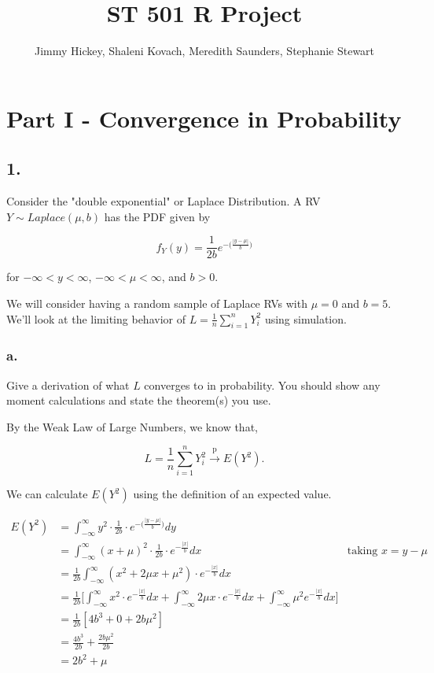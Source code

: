 \documentclass[12pt]{article}
\title{ST 501 R Project}
\author{Jimmy Hickey, Shaleni Kovach, Meredith Saunders, Stephanie Stewart}
\begin{document}
\maketitle
\tableofcontents
\clearpage

\doublespacing

\section{Part I - Convergence in Probability}

\subsection{1.}
Consider the "double exponential" or Laplace Distribution. A RV $Y \sim Laplace(\mu, b)$ has the PDF given by

$$f_Y(y) = \frac{1}{2b}e^{-\Big(  \frac{|y-\mu |}{b}   \Big) } $$

for $-\infty < y < \infty$, $-\infty < \mu < \infty$, and $b>0.$

We will consider having a random sample of Laplace RVs with $\mu = 0$ and $b = 5$. We'll look at the limiting behavior of $L=\frac{1}{n}\sum_{i=1}^{n}Y_i^2$ using simulation.

\subsubsection{a.}
Give a derivation of what $L$ converges to in probability. You should show any moment calculations and state the theorem(s) you use.

\bigskip


By the Weak Law of Large Numbers, we know that,

$$L = \frac{1}{n}\sum_{i=1}^{n}Y_i^2 \xrightarrow{\text{p}} E(Y^2).$$

We can calculate  $E(Y^2)$ using the definition of an expected value.

\begin{align*}
	 E(Y^2) & = \int_{-\infty}^{\infty} y^2 \cdot \frac{1}{2b} \cdot e^{-\Big(  \frac{|y-\mu |}{b} \Big)} dy\\
	 & =  \int_{-\infty}^{\infty} (x + \mu)^2 \cdot \frac{1}{2b} \cdot e^{-  \frac{|x|}{b}} dx & \text{taking } x = y - \mu\\
	 & = \frac{ 1 }{2b } \int_{-\infty}^{\infty} (x^2 + 2 \mu x  + \mu^2) \cdot e^{-  \frac{|x|}{b}}dx\\
	 & = \frac{ 1 }{2b } \Big[ \int_{-\infty}^{\infty} x^2 \cdot e^{-  \frac{|x|}{b}}dx+ \int_{-\infty}^{\infty} 2\mu x \cdot e^{-  \frac{|x|}{b}}dx+ \int_{-\infty}^{\infty} \mu^2 e^{-  \frac{|x|}{b}}dx \Big]\\
	 & = \frac{ 1 }{ 2b }[4b^3 + 0 + 2b\mu^2]\\
	 & = \frac{ 4b^3 }{ 2b } + \frac{ 2b\mu^2 }{ 2b }\\
	 & = 2b^2 + \mu
\end{align*}
\end{document}
